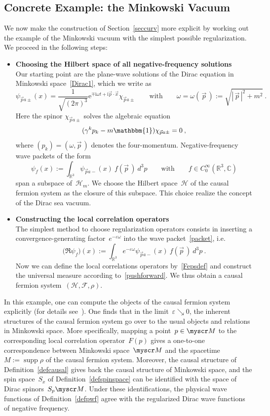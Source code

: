 \documentclass[reqno,11pt]{amsart}
\numberwithin{equation}{section}
\newcommand{\beq}{\begin{equation}}
\newcommand{\eeq}{\end{equation}}
\newcommand{\C}{\mathbb{C}}
\newcommand{\R}{\mathbb{R}}
\newcommand{\1}{\mbox{\rm 1 \hspace{-1.05 em} 1}}
\renewcommand{\H}{\mathscr{H}}
\newcommand{\F}{{\mathscr{F}}}
\newcommand{\scrM}{\myscr M}
\newcommand{\bitem}{\begin{itemize}[leftmargin=2.5em]}
\newcommand{\eitem}{\end{itemize}}
\newcommand{\itemD}{\item[{\raisebox{0.125em}{\tiny $\blacktriangleright$}}]}
\DeclareMathOperator{\supp}{supp}
\begin{document}
\subsection{Concrete Example: the Minkowski Vacuum} \label{secmink}
We now make the construction of Section~\ref{seccurv} more explicit by working out
the example of the Minkowski vacuum with the simplest possible regularization.
We proceed in the following steps: \vspace*{2.0mm}
\bitem \setlength\itemsep{1mm}
\itemD \textbf{Choosing the Hilbert space of all negative-frequency solutions} \\
Our starting point are the plane-wave solutions of the Dirac equation
in Minkowski space~\eqref{Dirac1}, which we write as
\[ \psi_{\vec{p}a\pm}(x)=\frac{1}{\sqrt{(2\pi)^3}}\mathrm{e}^{\mp\mathrm{i}\omega t+\mathrm{i}\vec{p}\cdot\vec{x}}\chi_{\vec{p}a\pm}\qquad\text{with}\qquad\omega=\omega(\,\vec{p}\,):=\sqrt{|\,\vec{p}\,|^2+m^2} \:. \]
Here the spinor $\chi_{\vec{p}a\pm}$ solves the algebraic equation
\[ %
(\gamma^kp_k-m\mathbbm{1})\chi_{\vec{p}a\pm}=0 \:, \]
where $(p_k)=(\omega,\vec{p}\,)$ denotes the four-momentum. Negative-frequency wave packets of the form
\beq \label{packet}
\psi_f(x) := \int_{\R^3} \psi_{\vec{p}a-}(x)\: f(\vec{p}\,)\: d^3p \qquad \text{with} \qquad f \in C^\infty_0(\R^3, \C)
\eeq
span a subspace of~$\H_m$. We choose the Hilbert space~$\H$ of the causal fermion system
as the closure of this subspace. This choice realize the concept of the Dirac sea vacuum.
\itemD \textbf{Constructing the local correlation operators} \\
The simplest method to choose regularization operators consists in inserting a convergence-generating factor~$e^{-\varepsilon \omega}$ into the wave packet~\eqref{packet}, i.e.
\[ \big({\mathfrak{R}} \psi_f \big)(x) := \int_{\R^3} e^{-\varepsilon \omega} \psi_{\vec{p}a-}(x)\: f(\vec{p}\,)\: d^3p \:. \]
Now we can define the local correlations operators by~\eqref{Fepsdef}
and construct the universal measure according to~\eqref{pushforward}. We thus obtain
a causal fermion system~$(\H, \F, \rho)$.
\eitem
In this example, one can compute the objects of the causal fermion system explicitly
(for details see~\cite[Section~1.2]{cfs}). One finds that in the limit~$\varepsilon \searrow 0$,
the inherent structures of the causal fermion system go over to the usual 
objects and relations in Minkowski space. More specifically, mapping a point~$p \in \scrM$
to the corresponding local correlation operator~$F(p)$ gives a one-to-one correspondence
between Minkowski space~$\scrM$ and the spacetime~$M:= \supp \rho$ of the causal fermion system.
Moreover, the causal structure of Definition~\ref{defcausal}
gives back the causal structure of Minkowski space, and the spin space~$S_x$ of Definition~\ref{defspinspace}
can be identified with the space of Dirac spinors~$S_p\scrM$.
Under these identifications, the physical wave functions of Definition~\ref{defpwf} agree with the
regularized Dirac wave functions of negative frequency.
\end{document}

